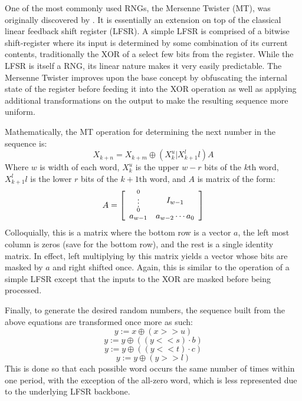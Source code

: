 One of the most commonly used RNGs, the Mersenne Twister (MT), was originally discovered by \cite{Matsumoto:1998:MTE:272991.272995}. It is essentially an extension on top of the classical linear feedback shift register (LFSR). A simple LFSR is comprised of a bitwise shift-register where its input is determined by some combination of its current contents, traditionally the XOR of a select few bits from the register. While the LFSR is itself a RNG, its linear nature makes it very easily predictable. The Mersenne Twister improves upon the base concept by obfuscating the internal state of the register before feeding it into the XOR operation as well as applying additional transformations on the output to make the resulting sequence more uniform.

Mathematically, the MT operation for determining the next number in the sequence is:
\begin{equation} \label{eq:mt}
    X_{k+n} = X_{k+m} \oplus \left(X_k^u | X_{k+1}^ll\right)A
\end{equation}
Where $w$ is width of each word, $X_k^u$ is the upper $w-r$ bits of the $k$th word, $X_{k+1}^ll$ is the lower $r$ bits of the $k+1$th word, and $A$ is matrix of the form:
\begin{equation} \label{eq:mtA}
A =  \mat{2}{\substack{0 \\ \vdots \\ 0} & I_{w-1}\\
           a_{w-1} & a_{w-2} \cdots a_0}
\end{equation}
Colloquially, this is a matrix where the bottom row is a vector $a$, the left most column is zeros (save for the bottom row), and the rest is a single identity matrix. In effect, left multiplying by this matrix yields a vector whose bits are masked by $a$ and right shifted once. Again, this is similar to the operation of a simple LFSR except that the inputs to the XOR are masked before being processed.

Finally, to generate the desired random numbers, the sequence built from the above equations are transformed once more as such:
\begin{equation} \label{eq:mt_t1}
    y := x \oplus (x >> u)
\end{equation}
\begin{equation} \label{eq:mt_t2}
    y := y \oplus ((y << s) \cdot b)
\end{equation}
\begin{equation} \label{eq:mt_t3}
    y := y \oplus ((y << t) \cdot c)
\end{equation}
\begin{equation} \label{eq:mt_t4}
    y := y \oplus (y >> l)
\end{equation}
This is done so that each possible word occurs the same number of times within one period, with the exception of the all-zero word, which is less represented due to the underlying LFSR backbone.

